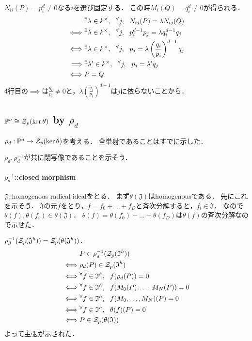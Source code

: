 \documentclass[a4paper]{jarticle}
\newcommand{\I}[1]{\mathfrak{#1}}
\begin{document}
    $N_{ii}(P)=p_i^d \neq 0$なる$i$を選び固定する．
    この時$M_i(Q)=q_i^d \neq 0$が得られる．
    \begin{align*}
        {}&     {}^{\exists} \lambda \in k^{\times},~~ {}^{\forall} j,~~ N_{ij}(P)=\lambda N_{ij}(Q) \\
    \iff&       {}^{\exists} \lambda \in k^{\times},~~ {}^{\forall} j,~~ p_i^{d-1}p_j=\lambda q_i^{d-1}q_j \\
    \iff&       {}^{\exists} \lambda \in k^{\times},~~ {}^{\forall} j,~~ p_j=\lambda \left(\frac{q_i}{p_i} \right)^{d-1}q_j \\
    \implies&   {}^{\exists} \lambda' \in k^{\times},~~ {}^{\forall} j,~~ p_j=\lambda' q_j \\
    \iff&       P=Q
    \end{align*}
    4行目の$\implies$は$\frac{q_i}{p_i} \neq 0$と，$\lambda \left(\frac{q_i}{p_i} \right)^{d-1}$は$j$に依らないことから．

    \subsection{$\mathbb{P}^n \cong \mathcal{Z}_p(\ker \theta)$ by $\rho_d$}
    $\rho_d: \mathbb{P}^n \to \mathcal{Z}_p(\ker \theta)$を考える．
    全単射であることはすでに示した．

    $\rho_d, \rho_d^{-1}$が共に閉写像であることを示そう．
    \paragraph{$\rho_d^{-1}$::closed morphism}
    $\I{J}$::homogenous radical idealをとる．
    まず$\theta(\I{J})$はhomogenousである．
    先にこれを示そう．
    $\I{J}$の元$f$をとり，$f=f_0+\dots+f_D$と斉次分解すると，$f_i \in \I{J}$．
    なので$\theta(f), \theta(f_i) \in \theta(\I{J})$．
    $\theta(f)=\theta(f_0)+\dots+\theta(f_D)$は$\theta(f)$の斉次分解なので示せた．

    $\rho_d^{-1}(\zerosp(\I{J}^h))=\zerosp(\theta(\I{J}^h))$．
    \begin{align*}
        {}&     P \in \rho_d^{-1}(\zerosp(\I{I}^h)) \\
        \iff&   \rho_d(P) \in \zerosp(\I{I}^h) \\
        \iff&   \Forall{f \in \I{I}^h} f(\rho_d(P))=0 \\
        \iff&   \Forall{f \in \I{I}^h} f(M_0(P), \dots, M_N(P))=0 \\
        \iff&   \Forall{f \in \I{I}^h} f(M_0, \dots, M_N)(P)=0 \\
        \iff&   \Forall{f \in \I{I}^h} \theta(f)(P)=0 \\
        \iff&   P \in \zerosp(\theta(\I{I}))
    \end{align*}
    よって主張が示された．
\end{document}
